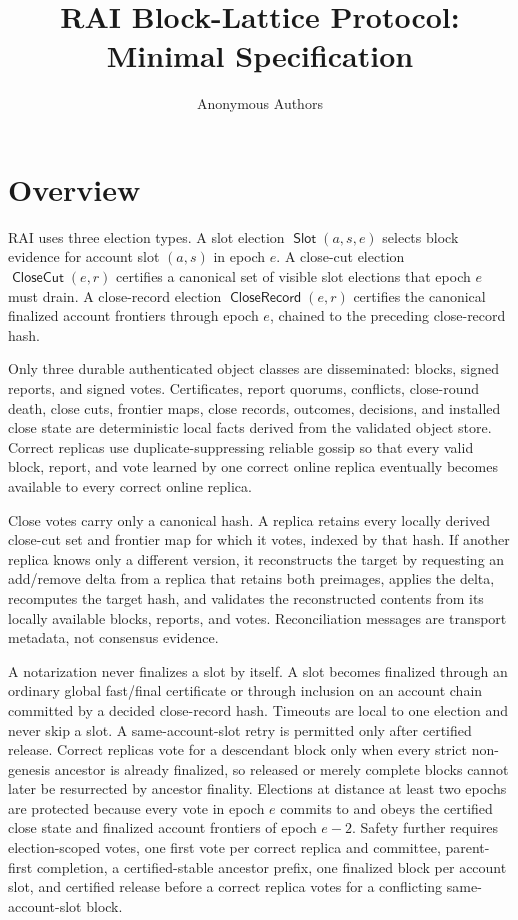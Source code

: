 \documentclass[sigplan,twocolumn,review,anonymous]{acmart}
\title{RAI Block-Lattice Protocol: Minimal Specification}
\author{Anonymous Authors}
\affiliation{%
  \institution{Paper under review}
  \city{}
  \country{}
}
\newcommand{\func}[1]{\operatorname{\mathsf{#1}}}
\newcommand{\Slot}{\func{Slot}}
\newcommand{\CloseCut}{\func{CloseCut}}
\newcommand{\CloseRecord}{\func{CloseRecord}}
\begin{document}
\maketitle

\section{Overview}

RAI uses three election types.  A slot election \(\Slot(a,s,e)\) selects block evidence for account slot \((a,s)\)
in epoch \(e\).  A close-cut election \(\CloseCut(e,r)\) certifies a canonical set of visible
slot elections that epoch \(e\) must drain.  A close-record election \(\CloseRecord(e,r)\)
certifies the canonical finalized account frontiers through epoch \(e\), chained to the preceding
close-record hash.

Only three durable authenticated object classes are disseminated: blocks, signed reports, and signed
votes.  Certificates, report quorums, conflicts, close-round death, close cuts, frontier maps, close
records, outcomes, decisions, and installed close state are deterministic local facts derived from the
validated object store.  Correct replicas use duplicate-suppressing reliable gossip so that every valid
block, report, and vote learned by one correct online replica eventually becomes available to every
correct online replica.

Close votes carry only a canonical hash.  A replica retains every locally derived close-cut set and
frontier map for which it votes, indexed by that hash.  If another replica knows only a different
version, it reconstructs the target by requesting an add/remove delta from a replica that retains both
preimages, applies the delta, recomputes the target hash, and validates the reconstructed contents from
its locally available blocks, reports, and votes.  Reconciliation messages are transport metadata, not
consensus evidence.

A notarization never finalizes a slot by itself.  A slot becomes finalized through an ordinary global
fast/final certificate or through inclusion on an account chain committed by a decided close-record
hash.  Timeouts are local to one election and never skip a slot.  A same-account-slot retry is permitted only
after certified release.  Correct replicas vote for a descendant block only when every strict
non-genesis ancestor is already finalized, so released or merely complete blocks cannot later be
resurrected by ancestor finality.  Elections at distance at least two epochs are protected because every
vote in epoch \(e\) commits to and obeys the certified close state and finalized account frontiers of
epoch \(e-2\).  Safety further requires election-scoped votes, one first vote per correct replica and
committee, parent-first completion, a certified-stable ancestor prefix, one finalized block per account slot,
and certified release before a correct replica votes for a conflicting same-account-slot block.
\end{document}
